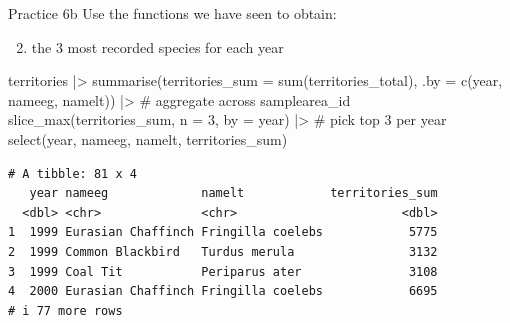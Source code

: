 \documentclass[
  ignorenonframetext,
  aspectratio=169,
  t]{beamer}
\newenvironment{Shaded}{\begin{snugshade}}{\end{snugshade}}
\newcommand{\AttributeTok}[1]{\textcolor[rgb]{0.40,0.45,0.13}{#1}}
\newcommand{\CommentTok}[1]{\textcolor[rgb]{0.37,0.37,0.37}{#1}}
\newcommand{\DecValTok}[1]{\textcolor[rgb]{0.68,0.00,0.00}{#1}}
\newcommand{\FunctionTok}[1]{\textcolor[rgb]{0.28,0.35,0.67}{#1}}
\newcommand{\NormalTok}[1]{\textcolor[rgb]{0.00,0.23,0.31}{#1}}
\newcommand{\SpecialCharTok}[1]{\textcolor[rgb]{0.37,0.37,0.37}{#1}}
\providecommand{\tightlist}{%
  \setlength{\itemsep}{0pt}\setlength{\parskip}{0pt}}
\begin{document}
\begin{frame}[fragile]{Practice 6b}
\protect{}\label{practice-6b}
Use the functions we have seen to obtain:

\begin{enumerate}
\setcounter{enumi}{1}
\tightlist
\item
  the 3 most recorded species for each year
\end{enumerate}

\footnotesize

\begin{Shaded}
\begin{Highlighting}[]
\NormalTok{territories }\SpecialCharTok{|\textgreater{}} 
    \FunctionTok{summarise}\NormalTok{(}\AttributeTok{territories\_sum =} \FunctionTok{sum}\NormalTok{(territories\_total),}
              \AttributeTok{.by =} \FunctionTok{c}\NormalTok{(year, nameeg, namelt)) }\SpecialCharTok{|\textgreater{}} \CommentTok{\# aggregate across samplearea\_id}
    \FunctionTok{slice\_max}\NormalTok{(territories\_sum, }\AttributeTok{n =} \DecValTok{3}\NormalTok{, }\AttributeTok{by =}\NormalTok{ year) }\SpecialCharTok{|\textgreater{}} \CommentTok{\# pick top 3 per year}
    \FunctionTok{select}\NormalTok{(year, nameeg, namelt, territories\_sum)}
\end{Highlighting}
\end{Shaded}

\begin{verbatim}
# A tibble: 81 x 4
   year nameeg             namelt            territories_sum
  <dbl> <chr>              <chr>                       <dbl>
1  1999 Eurasian Chaffinch Fringilla coelebs            5775
2  1999 Common Blackbird   Turdus merula                3132
3  1999 Coal Tit           Periparus ater               3108
4  2000 Eurasian Chaffinch Fringilla coelebs            6695
# i 77 more rows
\end{verbatim}

\normalsize
\end{frame}
\end{document}
